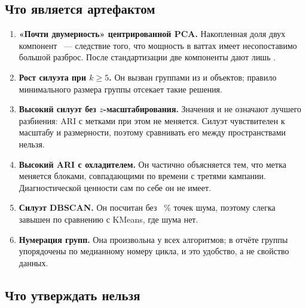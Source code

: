 \documentclass[14pt,a4paper]{extarticle}
\begin{document}
\subsection{Что является артефактом}

\begin{enumerate}
\item \textbf{«Почти двумерность» центрированной PCA.} Накопленная доля двух
  компонент \PcaCentCumTwo~--- следствие того, что мощность в ваттах имеет
  несопоставимо большой разброс. После стандартизации две компоненты дают
  лишь \PcaCumTwo.
\item \textbf{Рост силуэта при $k \ge 5$.} Он вызван группами из
  \KFiveSizeMin{} и \KSixSizeMin{} объектов; правило минимального размера
  группы отсекает такие решения.
\item \textbf{Высокий силуэт без $z$-масштабирования.} Значения
  \SensSilPcFourRaw{} и \SensSilPcTwoZ{} не означают лучшего разбиения:
  ARI с метками при этом не меняется. Силуэт чувствителен к масштабу и
  размерности, поэтому сравнивать его между пространствами нельзя.
\item \textbf{Высокий ARI с охладителем.} Он частично объясняется тем, что
  метка меняется блоками, совпадающими по времени с третями кампании.
  Диагностической ценности сам по себе он не имеет.
\item \textbf{Силуэт DBSCAN.} Он посчитан без \DbNoise~\% точек шума, поэтому
  слегка завышен по сравнению с KMeans, где шума нет.
\item \textbf{Нумерация групп.} Она произвольна у всех алгоритмов; в отчёте
  группы упорядочены по медианному номеру цикла, и это удобство, а не
  свойство данных.
\end{enumerate}

\subsection{Что утверждать нельзя}
\end{document}

